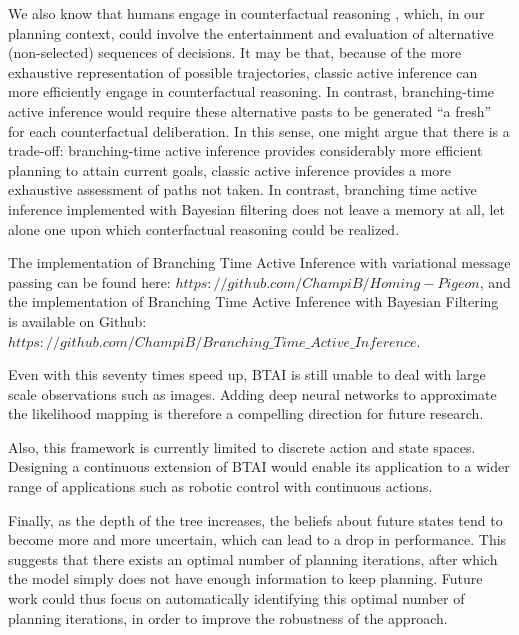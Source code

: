 \documentclass[twoside,11pt]{article}
\begin{document}
We also know that humans engage in counterfactual reasoning \citep{rafetseder2013counterfactual}, which, in our planning context, could involve the entertainment and evaluation of alternative (non-selected) sequences of decisions. It may be that, because of the more exhaustive representation of possible trajectories, classic active inference can more efficiently engage in counterfactual reasoning. In contrast, branching-time active inference would require these alternative pasts to be generated ``a fresh'' for each counterfactual deliberation. In this sense, one might argue that there is a trade-off: branching-time active inference provides considerably more efficient planning to attain current goals, classic active inference provides a more exhaustive assessment of paths not taken. In contrast, branching time active inference implemented with Bayesian filtering does not leave a memory at all, let alone one upon which conterfactual reasoning could be realized.

The implementation of Branching Time Active Inference with variational message passing can be found here: $https://github.com/ChampiB/Homing-Pigeon$, and the implementation of Branching Time Active Inference with Bayesian Filtering is available on Github: $https://github.com/ChampiB/Branching\_Time\_Active\_Inference$.

Even with this seventy times speed up, BTAI is still unable to deal with large scale observations such as images. Adding deep neural networks to approximate the likelihood mapping is therefore a compelling direction for future research.

Also, this framework is currently limited to discrete action and state spaces. Designing a continuous extension of BTAI would enable its application to a wider range of applications such as robotic control with continuous actions.

Finally, as the depth of the tree increases, the beliefs about future states tend to become more and more uncertain, which can lead to a drop in performance. This suggests that there exists an optimal number of planning iterations, after which the model simply does not have enough information to keep planning. Future work could thus focus on automatically identifying this optimal number of planning iterations, in order to improve the robustness of the approach.


\vskip 0.2in

\end{document}
